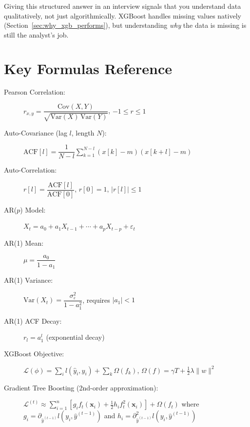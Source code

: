 \documentclass[11pt]{article}
\begin{document}
Giving this structured answer in an interview signals that you understand data
qualitatively, not just algorithmically. XGBoost handles missing values natively
(Section~\ref{sec:why_xgb_performs}), but understanding \emph{why} the data is
missing is still the analyst's job.

\newpage
\section{Key Formulas Reference}

\begin{description}
    \item[Pearson Correlation:]
    $r_{x,y} = \dfrac{\text{Cov}(X,Y)}{\sqrt{\text{Var}(X)\,\text{Var}(Y)}}$,
    \quad $-1 \leq r \leq 1$

    \item[Auto-Covariance (lag $l$, length $N$):]
    $\text{ACF}[l] = \dfrac{1}{N-l}\displaystyle\sum_{k=1}^{N-l}(x[k]-m)(x[k+l]-m)$

    \item[Auto-Correlation:]
    $r[l] = \dfrac{\text{ACF}[l]}{\text{ACF}[0]}$,
    \quad $r[0]=1$, \quad $|r[l]|\leq 1$

    \item[AR($p$) Model:]
    $X_t = a_0 + a_1 X_{t-1} + \cdots + a_p X_{t-p} + \varepsilon_t$

    \item[AR(1) Mean:]
    $\mu = \dfrac{a_0}{1-a_1}$

    \item[AR(1) Variance:]
    $\text{Var}(X_t) = \dfrac{\sigma_\varepsilon^2}{1-a_1^2}$, \quad requires $|a_1|<1$

    \item[AR(1) ACF Decay:]
    $r_l = a_1^l$ \quad (exponential decay)

    \item[XGBoost Objective:]
    $\mathcal{L}(\phi) = \displaystyle\sum_i l(\hat{y}_i, y_i) + \sum_k \Omega(f_k)$,
    \quad $\Omega(f) = \gamma T + \tfrac{1}{2}\lambda\|w\|^2$

    \item[Gradient Tree Boosting (2nd-order approximation):]
    $\mathcal{L}^{(t)} \approx \displaystyle\sum_{i=1}^n
    \!\left[g_i f_t(\mathbf{x}_i) + \tfrac{1}{2}h_i f_t^2(\mathbf{x}_i)\right]
    + \Omega(f_t)$
    where $g_i = \partial_{\hat{y}^{(t-1)}} l(y_i, \hat{y}^{(t-1)})$
    and $h_i = \partial^2_{\hat{y}^{(t-1)}} l(y_i, \hat{y}^{(t-1)})$
\end{description}
\end{document}
